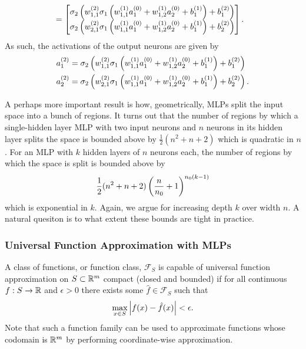 \documentclass[11pt]{article}
\begin{document}
\begin{example}
\begin{align*}
    &=
    \begin{bmatrix}
        \sigma_2\left(w_{1,1}^{(2)}\sigma_1\left(w_{1,1}^{(1)}a_1^{(0)}+w_{1,2}^{(1)}a_2^{(0)}+b_1^{(1)}\right) + b_1^{(2)}\right)\\
        \sigma_2\left(w_{2,1}^{(2)}\sigma_1\left(w_{1,1}^{(1)}a_1^{(0)}+w_{1,2}^{(1)}a_2^{(0)}+b_1^{(1)}\right) + b_2^{(2)}\right)
    \end{bmatrix}.
    \end{align*}
    As such, the activations of the output neurons are given by
    \begin{align*}
        a_1^{(2)}&=\sigma_2\left(w_{1,1}^{(2)}\sigma_1\left(w_{1,1}^{(1)}a_1^{(0)}+w_{1,2}^{(1)}a_2^{(0)}+b_1^{(1)}\right) + b_1^{(2)}\right)\\
        a_2^{(2)}&=\sigma_2\left(w_{2,1}^{(2)}\sigma_1\left(w_{1,1}^{(1)}a_1^{(0)}+w_{1,2}^{(1)}a_2^{(0)}+b_1^{(1)}\right) + b_2^{(2)}\right).
    \end{align*}
\end{example}

\begin{tcolorbox}[title={\centering\textbf{Further crudely advocating for depth over width}}, colback=myLightBlue, colbacktitle=myDarkBlue, colframe=myDarkBlue, coltitle=white]
    A perhaps more important result is how, geometrically, MLPs split the input space into a bunch of regions. It turns out that the number of regions by which a single-hidden layer MLP with two input neurons and $n$ neurons in its hidden layer splits the space is bounded above by $\frac{1}{2}(n^2+n+2)$ which is quadratic in $n$. For an MLP with $k$ hidden layers of $n$ neurons each, the number of regions by which the space is split is bounded above by
    $$
    \frac{1}{2}(n^2+n+2)\left(\frac{n}{n_0}+1\right)^{n_0(k-1)}
    $$
    which is exponential in $k$. Again, we argue for increasing depth $k$ over width $n$. A natural quesiton is to what extent these bounds are tight in practice.
\end{tcolorbox}

\subsubsection{Universal Function Approximation with MLPs}
\label{subsubsec:universal_function_approximation_theorem}
A class of functions, or function class, $\mathcal{F}_S$ is capable of universal function approximation on $S\subset\mathbb{R}^m$ compact (closed and bounded) if for all continuous $f:S\to\mathbb{R}$ and $\epsilon>0$ there exists some $\hat{f}\in\mathcal{F}_S$ such that
$$
\max_{x\in S}\left|f(x)-\hat{f}(x)\right|<\epsilon.
$$
Note that such a function family can be used to approximate functions whose codomain is $\mathbb{R}^m$ by performing coordinate-wise approximation. 
\end{document}
